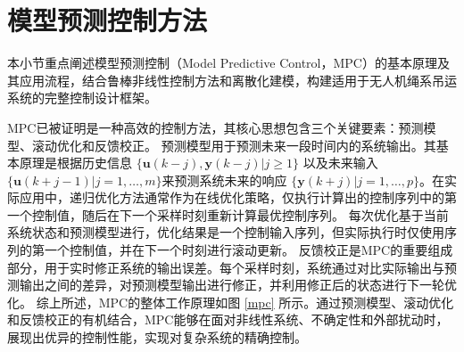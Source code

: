 \documentclass[lang=chs, degree=master, blindreview=false, winfonts=true]{yanputhesis}
\begin{document}





\section{模型预测控制方法}
本小节重点阐述模型预测控制（Model Predictive Control，MPC）的基本原理及其应用流程，结合鲁棒非线性控制方法和离散化建模，构建适用于无人机绳系吊运系统的完整控制设计框架。

MPC已被证明是一种高效的控制方法\cite{2003A}，其核心思想包含三个关键要素：预测模型、滚动优化和反馈校正。
预测模型用于预测未来一段时间内的系统输出。其基本原理是根据历史信息 $\{ \bm u(k-j), \bm y(k-j) | j \geq 1 \}$ 以及未来输入 $\{ \bm u(k+j-1) | j = 1, \dots, m \}$来预测系统未来的响应 $\{ \bm y(k+j) | j = 1, \dots, p \}$。在实际应用中，递归优化方法通常作为在线优化策略，仅执行计算出的控制序列中的第一个控制值，随后在下一个采样时刻重新计算最优控制序列。
每次优化基于当前系统状态和预测模型进行，优化结果是一个控制输入序列，但实际执行时仅使用序列的第一个控制值，并在下一个时刻进行滚动更新。
反馈校正是MPC的重要组成部分，用于实时修正系统的输出误差。每个采样时刻，系统通过对比实际输出与预测输出之间的差异，对预测模型输出进行修正，并利用修正后的状态进行下一轮优化。
综上所述，MPC的整体工作原理如图 \ref{mpc} 所示。通过预测模型、滚动优化和反馈校正的有机结合，MPC能够在面对非线性系统、不确定性和外部扰动时，展现出优异的控制性能，实现对复杂系统的精确控制。
\end{document}

